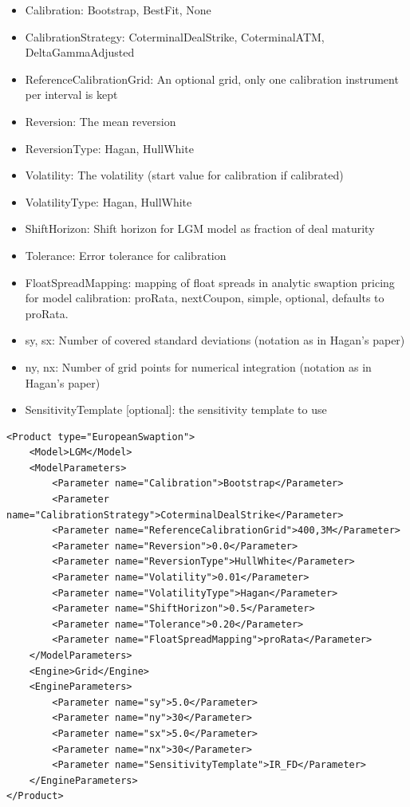 \begin{itemize}
\item Calibration: Bootstrap, BestFit, None
\item CalibrationStrategy: CoterminalDealStrike, CoterminalATM, DeltaGammaAdjusted
\item ReferenceCalibrationGrid: An optional grid, only one calibration instrument per interval is kept
\item Reversion: The mean reversion
\item ReversionType: Hagan, HullWhite
\item Volatility: The volatility (start value for calibration if calibrated)
\item VolatilityType: Hagan, HullWhite
\item ShiftHorizon: Shift horizon for LGM model as fraction of deal maturity
\item Tolerance: Error tolerance for calibration
\item FloatSpreadMapping: mapping of float spreads in analytic swaption pricing for model calibration: proRata,
  nextCoupon, simple, optional, defaults to proRata.
\item sy, sx: Number of covered standard deviations (notation as in Hagan's paper)
\item ny, nx: Number of grid points for numerical integration (notation as in Hagan's paper)
\item SensitivityTemplate [optional]: the sensitivity template to use
\end{itemize}

\begin{longlisting}
\begin{verbatim}
<Product type="EuropeanSwaption">
    <Model>LGM</Model>
    <ModelParameters>
        <Parameter name="Calibration">Bootstrap</Parameter>
        <Parameter name="CalibrationStrategy">CoterminalDealStrike</Parameter>
        <Parameter name="ReferenceCalibrationGrid">400,3M</Parameter>
        <Parameter name="Reversion">0.0</Parameter>
        <Parameter name="ReversionType">HullWhite</Parameter>
        <Parameter name="Volatility">0.01</Parameter>
        <Parameter name="VolatilityType">Hagan</Parameter>
        <Parameter name="ShiftHorizon">0.5</Parameter>
        <Parameter name="Tolerance">0.20</Parameter>
        <Parameter name="FloatSpreadMapping">proRata</Parameter>
    </ModelParameters>
    <Engine>Grid</Engine>
    <EngineParameters>
        <Parameter name="sy">5.0</Parameter>
        <Parameter name="ny">30</Parameter>
        <Parameter name="sx">5.0</Parameter>
        <Parameter name="nx">30</Parameter>
        <Parameter name="SensitivityTemplate">IR_FD</Parameter>
    </EngineParameters>
</Product>
\end{verbatim}
\caption{Configuration for Product EuropeanSwaption, Model LGM, Engine Grid}
\label{lst:peconfig_EuropeanSwaption_LGM_Grid}
\end{longlisting}

